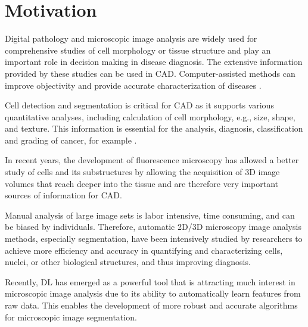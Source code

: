 \label{chap:intro}
\section{Motivation}
\label{section:motivation}

Digital pathology and microscopic image analysis are widely used for comprehensive studies of cell morphology or tissue structure and play an important role in decision making in disease diagnosis. The extensive information provided by these studies can be used in \ac{CAD}. Computer-assisted methods can improve objectivity and provide accurate characterization of diseases \cite{review:1}. 

Cell detection and segmentation is critical for \ac{CAD} as it supports various quantitative analyses, including calculation of cell morphology, e.g., size, shape, and texture. This information is essential for the analysis, diagnosis, classification and grading of cancer, for example \cite{review:2}.

In recent years, the development of fluorescence microscopy has allowed a better study of cells and its substructures by allowing the acquisition of \ac{3D} image volumes that reach deeper into the tissue \cite{fluorescence} and are therefore very important sources of information for \ac{CAD}.

Manual analysis of large image sets is labor intensive, time consuming, and can be biased by individuals. Therefore, automatic \ac{2D}/\ac{3D} microscopy image analysis methods, especially segmentation, have been intensively studied by researchers \cite{review:2021deep} to achieve more efficiency and accuracy in quantifying and characterizing cells, nuclei, or other biological structures, and thus improving diagnosis.

Recently, \ac{DL} has emerged as a powerful tool that is attracting much interest in microscopic image analysis \cite{review:3} due to its ability to automatically learn features from raw data. This enables the development of more robust and accurate algorithms for microscopic image segmentation. 

